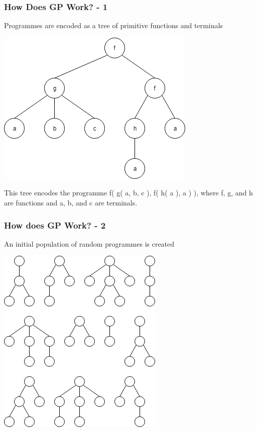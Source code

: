 \documentclass{beamer}
\begin{document}
		\begin{frame}
		
			\frametitle{How Does GP Work? - 1}
			
			Programmes are encoded as a tree of primitive functions and terminals
			
			\begin{center}
				
				\includegraphics[scale=0.5]{resources/1_gp_example_tree}
				
				This tree encodes the programme f( g( a, b, c ), f( h( a ), a ) ), where f, g, and h are functions and a, b, and c are terminals.
				
			\end{center}
			
			
		
		\end{frame}
	
		\begin{frame}
			
			\frametitle{How does GP Work? - 2}
			
			\begin{center}
				
				An initial population of random programmes is created
				
				\includegraphics[scale=0.4]{resources/2_gp_example_population}
				
			\end{center}
			
		\end{frame}
	
\end{document}
